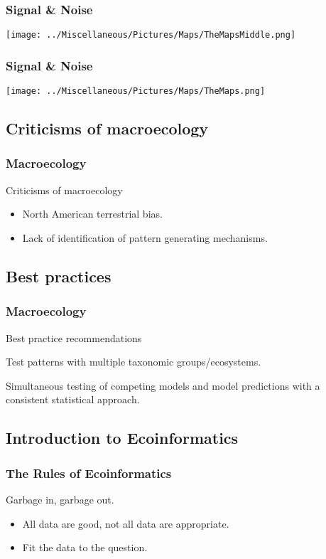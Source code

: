 \documentclass[14pt]{beamer}
\begin{document}
\begin{frame}[t]
\frametitle{Signal \& Noise}
\begin{center}
\texttt{[image: ../Miscellaneous/Pictures/Maps/TheMapsMiddle.png]}
\end{center}
\end{frame}

\begin{frame}[t]
\frametitle{Signal \& Noise}
\begin{center}
\texttt{[image: ../Miscellaneous/Pictures/Maps/TheMaps.png]}
\end{center}
\end{frame}

\subsection{Criticisms of macroecology}
\begin{frame}[t]
\frametitle{Macroecology}
Criticisms of macroecology\\
\begin{itemize}
\item North American terrestrial bias.
\item Lack of identification of pattern generating mechanisms.
\end{itemize}
\end{frame}

\subsection{Best practices}
\begin{frame}[t]
\frametitle{Macroecology}
Best practice recommendations\\
\begin{itemize}
\begin{small}
\item Test patterns with multiple taxonomic groups/ecosystems.  
\item Simultaneous testing of competing models and model predictions with a consistent statistical approach.
\end{small}
\end{itemize}
\end{frame}


\subsection{Introduction to Ecoinformatics}
\begin{frame}[t]
\frametitle{The Rules of Ecoinformatics}
\begin{Large}
Garbage in, garbage out.\\
\end{Large}
\begin{itemize}
\item All data are good, not all data are appropriate.
\item Fit the data to the question.
\end{itemize}
\end{frame}
\end{document}
